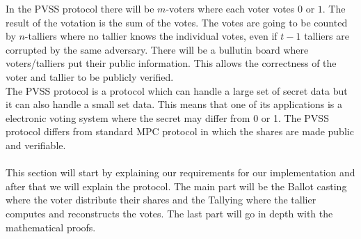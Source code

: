 In the PVSS protocol there will be $m$-voters where each voter votes $0$ or $1$. The result of the votation is the sum of the votes. The votes are going to be counted by $n$-talliers where no tallier knows the individual votes, even if $t-1$ talliers are corrupted by the same adversary. There will be a bullutin board where voters/talliers put their public information. This allows the correctness of the voter and tallier to be publicly verified.\\

\noindent
The PVSS protocol is a protocol which can handle a large set of secret data but it can also handle a small set data. This means that one of its applications is a  electronic voting system where the secret may differ from 0 or 1. The PVSS protocol differs from standard MPC protocol in which the shares are made public and verifiable.\\\\
This section will start by explaining our requirements for our implementation and after that we will explain the protocol. The main part will be the Ballot casting where the voter distribute their shares and the Tallying where the tallier computes and reconstructs the votes. The last part will go in depth with the mathematical proofs. \\

\noindent

